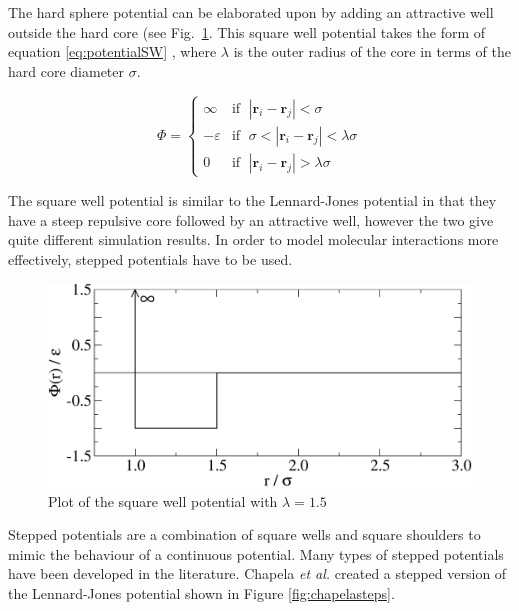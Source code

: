 \documentclass[12pt]{UoAthesis}
\begin{document}
The hard sphere potential can be elaborated upon by adding an
attractive well outside the hard core (see Fig.~\ref{fig:squareWell}.
This square well potential takes the form of equation
\eqref{eq:potentialSW} \cite{Barker1967}, where $\lambda$ is the outer
radius of the core in terms of the hard core diameter $\sigma$.

\begin{equation}
  \label{eq:potentialSW}
  \Phi = 
  \begin{cases}
    \infty &\text{if }\; |\mathbf{r}_i - \mathbf{r}_j| < \sigma \\
    -\varepsilon &\text{if }\; \sigma < |\mathbf{r}_i - \mathbf{r}_j| < \lambda\sigma \\
    0 &\text{if }\; |\mathbf{r}_i - \mathbf{r}_j| > \lambda\sigma
  \end{cases}
\end{equation}

The square well potential is similar to the Lennard-Jones potential in
that they have a steep repulsive core followed by an attractive well,
however the two give quite different simulation results.  In order to
model molecular interactions more effectively, stepped potentials have
to be used.

\begin{figure}[htp] 
  \begin{center}
    \includegraphics[clip,scale=0.45]{figures/squareWell} 
    \caption{\label{fig:squareWell} Plot of the square well potential
      with $\lambda = 1.5$}
  \end{center}
\end{figure}

Stepped potentials are a combination of square wells and square
shoulders to mimic the behaviour of a continuous potential.  Many
types of stepped potentials have been developed in the literature.
Chapela \textit{et al.} \cite{Chapela1989} created a stepped version
of the Lennard-Jones potential shown in Figure \ref{fig:chapelasteps}.
\end{document}
